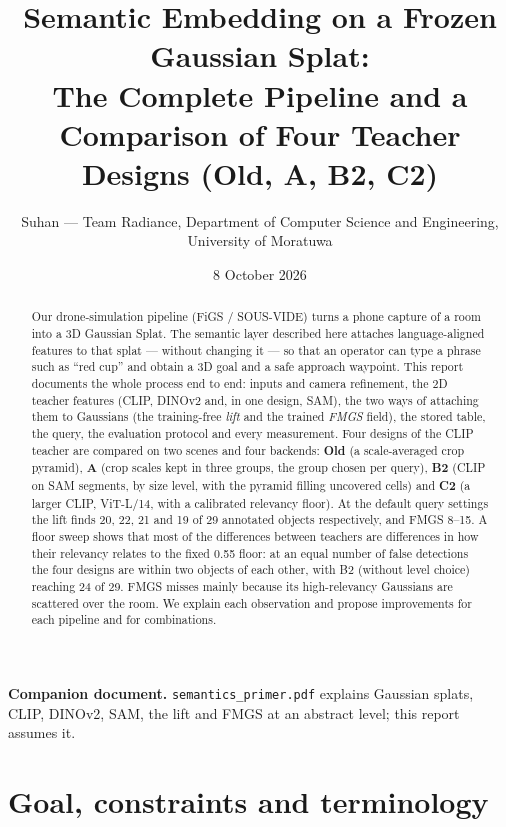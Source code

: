 \documentclass[11pt,a4paper]{article}
\title{Semantic Embedding on a Frozen Gaussian Splat:\\[2pt]
\large The Complete Pipeline and a Comparison of Four Teacher Designs (Old, A, B2, C2)}
\author{Suhan --- Team Radiance, Department of Computer Science and Engineering,\\University of Moratuwa}
\date{8 October 2026}
\newcommand{\code}[1]{\texttt{#1}}
\begin{document}
\maketitle

\begin{abstract}
Our drone-simulation pipeline (FiGS / SOUS-VIDE) turns a phone capture of a room into a 3D Gaussian Splat. The
semantic layer described here attaches language-aligned features to that splat --- without changing it --- so that an
operator can type a phrase such as ``red cup'' and obtain a 3D goal and a safe approach waypoint. This report documents
the whole process end to end: inputs and camera refinement, the 2D teacher features (CLIP, DINOv2 and, in one design,
SAM), the two ways of attaching them to Gaussians (the training-free \emph{lift} and the trained \emph{FMGS} field),
the stored table, the query, the evaluation protocol and every measurement. Four designs of the CLIP teacher are
compared on two scenes and four backends: \textbf{Old} (a scale-averaged crop pyramid), \textbf{A} (crop scales kept in
three groups, the group chosen per query), \textbf{B2} (CLIP on SAM segments, by size level, with the pyramid filling
uncovered cells) and \textbf{C2} (a larger CLIP, ViT-L/14, with a calibrated relevancy floor). At the default query
settings the lift finds 20, 22, 21 and 19 of 29 annotated objects respectively, and FMGS 8--15. A floor sweep shows that
most of the differences between teachers are differences in how their relevancy relates to the fixed 0.55 floor: at an
equal number of false detections the four designs are within two objects of each other, with B2 (without level choice)
reaching 24 of 29. FMGS misses mainly because its high-relevancy Gaussians are scattered over the room. We explain each
observation and propose improvements for each pipeline and for combinations.
\end{abstract}

\noindent\textbf{Companion document.} \code{semantics\_primer.pdf} explains Gaussian splats, CLIP, DINOv2, SAM, the lift
and FMGS at an abstract level; this report assumes it.

\tableofcontents
\newpage

\section{Goal, constraints and terminology}
\end{document}

